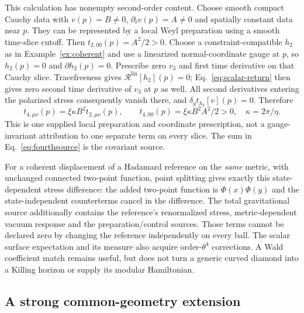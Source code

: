 \documentclass[12pt]{article}
\theoremstyle{definition}
\theoremstyle{remark}
\begin{document}
This calculation has nonempty second-order content. Choose smooth compact
Cauchy data with $v(p)=B\ne0$, $\partial_t v(p)=A\ne0$ and spatially
constant data near $p$. They can be represented by a local Weyl preparation
using a smooth time-slice cutoff. Then $t_{2,00}(p)=A^2/2>0$.
Choose a constraint-compatible $h_2$ as in Example~\ref{ex:coherent}
and use a linearized normal-coordinate gauge at $p$, so $h_2(p)=0$
and $\partial h_2(p)=0$. Prescribe zero $v_3$ and first time derivative
on that Cauchy slice. Tracefreeness gives
$\mathcal R^{\mathrm{lin}}[h_2](p)=0$; Eq.~\eqref{eq:scalar-return}
then gives zero second time derivative of $v_3$ at $p$ as well.
All second derivatives entering the polarized stress consequently vanish
there, and $\delta_gt_{h_2}[v](p)=0$. Therefore
\[
 t_{4,\mu\nu}(p)=\xi\kappa B^2t_{2,\mu\nu}(p),\qquad
 t_{4,00}(p)=\xi\kappa B^2A^2/2>0,
 \quad \kappa=2\pi/\eta.
\]
This is one supplied local preparation and coordinate prescription,
not a gauge-invariant attribution to one separate term on every slice.
The sum in Eq.~\eqref{eq:fourthsource} is the covariant source.

For a coherent displacement of a Hadamard reference on the \emph{same}
metric, with unchanged connected two-point function, point splitting
gives exactly this state-dependent stress difference: the added
two-point function is $\Phi(x)\Phi(y)$ and the state-independent
counterterms cancel in the difference. The total gravitational source additionally contains
the reference's renormalized stress, metric-dependent vacuum response
and the preparation/control sources. Those terms cannot be declared
zero by changing the reference independently on every ball. The scalar
surface expectation and its measure also acquire order-$\theta^4$
corrections. A Wald coefficient match remains useful, but does not turn
a generic curved diamond into a Killing horizon or supply its modular
Hamiltonian.

\subsection{A strong common-geometry extension}
\end{document}
